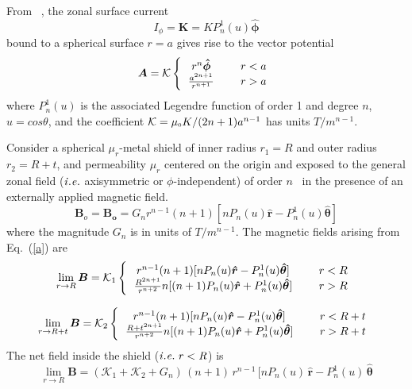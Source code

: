 From ~\cite{CB1, smythe}, the zonal surface current
\begin{equation}\label{i}
I_\phi=\bm{K}=KP_n^1(u)\bm{\hat{\phi}}
\end{equation}
bound to a spherical surface $r=a$ gives rise to the vector potential
\begin{equation}\label{a}
\bm A =\mathcal{K} 
\left \{
  \begin{tabular}{ccc}
  $r^n \bm{\hat{\phi}}$ &  & $r< a$  \\
  $\frac{a^{2n+1}}{r^{n+1}}$ &  & $r> a$ 
  \end{tabular}
 \right.
\end{equation}
where $P_n^1(u)$ is the associated Legendre function of order 1 and degree $n$,  $u=cos\theta$, and the coefficient $\mathcal{K}={\mu_{\scriptscriptstyle 0} K}/{(2n+1)a^{n-1}}$ has units $T/m^{n-1}$.

Consider a spherical $\mu_r$-metal shield of inner radius $r_1=R$ and outer radius $r_2=R+t$, and permeability $\mu_r$ centered on the origin and exposed to the general zonal field ($\it{i.e.}$ axisymmetric or $\phi$-independent) of order $n$~\cite{CB1, smythe} in the presence of an externally applied magnetic field. 
\begin{equation}\label{bo}
\bm B_o = \bm{B_o} = G_n r^{n-1} (n+1)[n P_n(u) \bm{\hat{r}} -  P_n^1(u)  \bm{\hat{\theta}} ] 
\end{equation}
where the magnitude $G_n$ is in units of $T/m^{n-1}$.
The magnetic fields arising from Eq.~(\ref{a}) are
\begin{equation}\label{r=R}
\lim_{r\to R}\bm B =\mathcal{K}_1
\left \{
  \begin{tabular}{ccc}
  $r^{n-1}(n+1)[n P_n(u)\bm{\hat{r}} -  P_n^1(u) \bm{\hat{\theta}} ]$ &  & $r< R$  \\
  $\frac{R^{2n+1}}{r^{n+2}}
n[(n+1) P_n(u) \bm{\hat{r}} +  P_n^1(u)  \bm{\hat{\theta}} ]$ &  & $r> R$  
  \end{tabular}
\right. 
\end{equation}

\begin{equation}\label{r=R+t}
\lim_{r\to R+t}\bm B =\mathcal{K}_2
\left \{
  \begin{tabular}{ccc}
  $r^{n-1} (n+1)[n P_n(u)\bm{\hat{r}} -  P_n^1(u)\bm{\hat{\theta}} ]$ &  & $r< R+t$  \\
  $\frac{{R+t}^{2n+1}}{r^{n+2}}n[(n+1) P_n(u)\bm{\hat{r}} +  P_n^1(u) \bm{\hat{\theta}} ]$ &  & $r> R+t$  
  \end{tabular}
\right.
\end{equation}
 The net field inside the shield ($\it{i.e.}\;r<R$) is 
\begin{equation}\label{r<R}
\lim_{r\to R}\bm B = (\mathcal{K}_1+\mathcal{K}_2+G_n) \, (n+1)\, r^{n-1} \, [n P_n(u) \, \bm{\hat{r}} -  P_n^1(u)  \, \bm{\hat{\theta}}
\end{equation}

